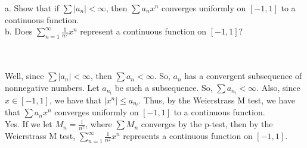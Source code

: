 a. Show that if $\sum|a_n|<\infty$, then $\sum a_nx^n$ converges uniformly on $[-1,1]$ to a continuous
function.\\

b. Does $\sum_{n=1}^{\infty}\frac{1}{n^2}x^n$ represent a continuous function on $[-1,1]$?\\\\

\begin{solution}\renewcommand{\qedsymbol}{}\ \\
    Well, since $\sum|a_n|<\infty$, then $\sum a_n<\infty$. So, $a_n$ has a convergent subsequence of
    nonnegative numbers. Let $a_{n_l}$ be such a subsequence. So, $\sum a_{n_l}<\infty$. Also, since
    $x\in[-1,1]$, we have that $|x^n|\leq a_{n_l}$. Thus, by the Weierstrass M test, we have that
    $\sum a_nx^n$ converges uniformly on $[-1,1]$ to a continuous function.\\

    Yes. If we let $M_n=\frac{1}{n^2}$, where $\sum M_n$ converges by the p-test, then by the
    Weierstrass M test, $\sum_{n=1}^{\infty}\frac{1}{n^2}x^n$ represents a continuous function on
    $[-1,1]$.

\end{solution}